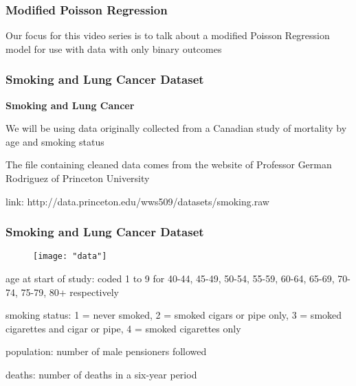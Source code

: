 \documentclass{beamer}
\begin{document}
\begin{frame}[fragile]\frametitle{Modified Poisson Regression}
	
	Our focus for this video series is to talk about a modified Poisson Regression model for use with data with only binary outcomes
	
\end{frame}



\begin{frame}[fragile]\frametitle{Smoking and Lung Cancer Dataset}

	\textbf{Smoking and Lung Cancer} 
	
	We will be using data originally collected from a Canadian study of mortality by age and smoking status
	
	The file containing cleaned data comes from the website of Professor German Rodriguez of Princeton University 
	
	link: http://data.princeton.edu/wws509/datasets/smoking.raw

\end{frame}



\begin{frame}[fragile]\frametitle{Smoking and Lung Cancer Dataset}

	\begin{figure}
	\centering
		\texttt{[image: "data"]}
	\end{figure}

	\begin{itemize}
		\footnotesize{
			\item age at start of study: coded 1 to 9 for 40-44, 45-49, 50-54, 55-59, 60-64, 65-69, 70-74, 75-79, 80+ respectively
			\item smoking status: 1 = never smoked, 2 = smoked cigars or pipe only, 3 = smoked cigarettes and cigar or pipe, 4 = smoked cigarettes only
			\item population: number of male pensioners followed
			\item deaths: number of deaths in a six-year period
		}
	\end{itemize}

\end{frame}
\end{document}
